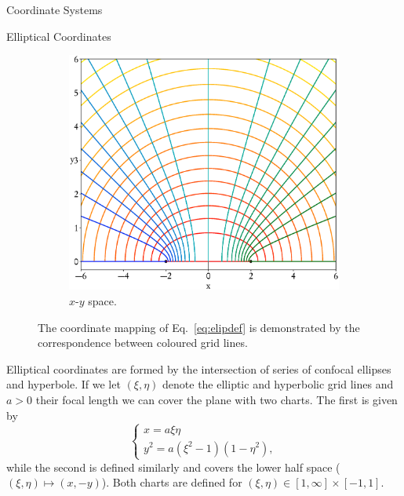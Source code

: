 \documentclass[letterpaper, 11 pt]{report}
\begin{document}
\begin{appendices}
\begin{chapter}{Coordinate Systems \label{chap:coords}}
\begin{section}{Elliptical Coordinates \label{sec:elliptic}}
\begin{figure}[t]
\begin{subfigure}{.5\textwidth}
               \includegraphics[width=\linewidth]{./images/appendix/eliptical.eps}
               \caption{$x$-$y$ space. \label{fig:xy}}
            \end{subfigure}
            \caption[Coordinate chart of elliptical coordinates]{The coordinate mapping of
                     Eq.~\eqref{eq:elipdef} is demonstrated by the correspondence between
                     coloured grid lines.\label{fig:elliptic}}
         \end{figure}

         Elliptical coordinates are formed by the intersection of series of confocal ellipses and
         hyperbole. If we let $(\xi, \eta)$ denote the elliptic and hyperbolic grid lines and $a > 0$
         their focal length we can cover the plane with two charts. The first is given by
         \begin{equation} \label{eq:elipdef}
            \left\{
            \begin{array}{l}
               x   = a \xi \eta \\
               y^2 = a \left( \xi^2 - 1 \right) \left( 1 - \eta^2 \right),
            \end{array}
            \right.
         \end{equation}
         while the second is defined similarly and covers the lower half space ($(\xi,\eta) \mapsto
         (x,-y)$). Both charts are defined for $(\xi,\eta) \in [1, \infty] \times [-1,1]$.


\end{section}
\end{chapter}
\end{appendices}
\end{document}
